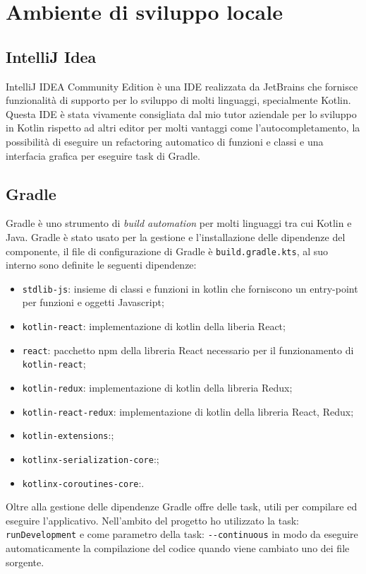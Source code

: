 \section{Ambiente di sviluppo locale}
\subsection{IntelliJ Idea}
IntelliJ IDEA Community Edition è una IDE realizzata da JetBrains che fornisce funzionalità di supporto per lo sviluppo di molti linguaggi, specialmente Kotlin. Questa IDE è stata vivamente consigliata dal mio tutor aziendale per lo sviluppo in Kotlin rispetto ad altri editor per molti vantaggi come l'autocompletamento, la possibilità di eseguire un refactoring automatico di funzioni e classi e una interfacia grafica per eseguire task di Gradle.
 
\subsection{Gradle}
Gradle è uno strumento di \emph{build automation} per molti linguaggi tra cui Kotlin e Java. Gradle è stato usato per la gestione e l'installazione delle dipendenze del componente, il file di configurazione di Gradle è \verb|build.gradle.kts|, al suo interno sono definite le seguenti dipendenze:
\begin{itemize}
	\item \verb|stdlib-js|: insieme di classi e funzioni in kotlin che forniscono un entry-point per funzioni e oggetti Javascript;
	
	\item \verb|kotlin-react|: implementazione di kotlin della liberia React;
	
	\item \verb|react|: pacchetto npm della libreria React necessario per il funzionamento di \verb|kotlin-react|;
	
	\item \verb|kotlin-redux|: implementazione di kotlin della libreria Redux;
	
	\item \verb|kotlin-react-redux|: implementazione di kotlin della libreria React, Redux;
	
	\item \verb|kotlin-extensions|:;
	
	\item \verb|kotlinx-serialization-core|:;
	
	\item \verb|kotlinx-coroutines-core|:.
\end{itemize}
\noindent
Oltre alla gestione delle dipendenze Gradle offre delle task, utili per compilare ed eseguire l'applicativo. Nell'ambito del progetto ho utilizzato la task: \verb|runDevelopment| e come parametro della task: \verb|--continuous| in modo da eseguire automaticamente la compilazione del codice quando viene cambiato uno dei file sorgente.

